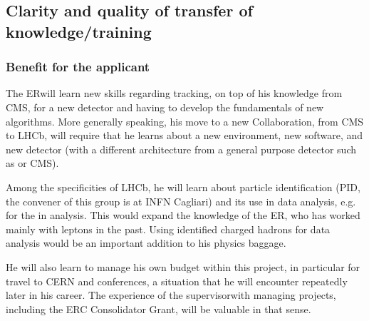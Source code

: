 \documentclass[a4paper,11pt]{article}
\newcommand{\ER}{ER}
\newcommand{\supervisor}{the supervisor}
\begin{document}
%       

\subsection{Clarity and quality of transfer of knowledge/training}



\subsubsection{Benefit for the applicant}
\label{sec:benefitapplicant}

The \ER will learn new skills regarding tracking, on top of his knowledge from CMS, for a new detector and having to develop the fundamentals of new algorithms. More generally speaking, his move to a new Collaboration, from CMS to LHCb, will require that he learns about a new environment, new software, and new detector (with a different architecture from a general purpose detector such as \DO or CMS). 

Among the specificities of LHCb, he will learn about particle identification (PID, the convener of this group is at INFN Cagliari) and its use in data analysis, e.g. for the \Dz in \pbpb analysis. 
This would expand the knowledge of the \ER, who has worked mainly with leptons in the past. Using identified charged hadrons for data analysis would be an important addition to his physics baggage.

He will also learn to manage his own budget within this project, in particular for travel to CERN and conferences, a situation that he will encounter repeatedly later in his career. The experience of \supervisor with managing projects, including the ERC Consolidator Grant, will be valuable in that sense.
\end{document}
